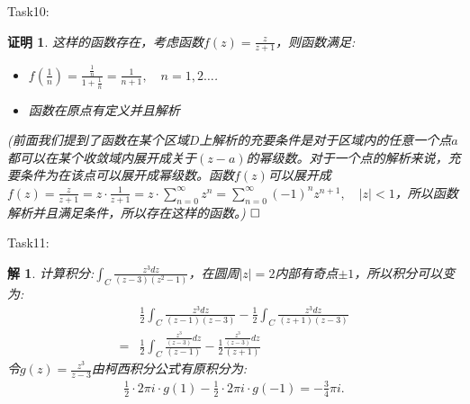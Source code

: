 \documentclass{ctexart}
\newcommand{\。}{．} %
\newenvironment{lanse}{
    \begin{tcolorbox}[breakable,enhanced, colback=qlan, boxrule=0pt, frame hidden,
        borderline west={0.7mm}{0.1mm}{slan}]
    }
    {\end{tcolorbox}}
\theoremstyle{t} %
\newtheorem*{tmhj}{\color{slan} 解}
\newtheorem*{zmhj}{\color{slan} 证明}
\newenvironment{zm}{\begin{lanse}\begin{zmhj}}{$\hfill \square$\end{zmhj}\end{lanse}}
\newenvironment{tm}{\begin{lanse}\begin{tmhj}}{\end{tmhj}\end{lanse}}
\begin{document}
Task10:
\begin{zm}
    这样的函数存在，考虑函数$f(z)=\frac{z}{z+1}$，则函数满足:
    \begin{itemize}
        \item $f(\frac{1}{n})=\frac{\frac{1}{n}}{1+\frac{1}{n}}=\frac{1}{n+1},\quad n=1,2\dots$.
        \item 函数在原点有定义并且解析
    \end{itemize}
    (前面我们提到了函数在某个区域$D$上解析的充要条件是对于区域内的任意一个点$a$都可以在某个收敛域内展开成关于$(z-a)$的幂级数。对于一个点的解析来说，充要条件为在该点可以展开成幂级数。函数$f(z)$可以展开成$f(z)=\frac{z}{z+1}=z\cdot \frac{1}{z+1}=z\cdot\sum_{n=0}^{\infty}z^n=\sum_{n=0}^{\infty}(-1)^nz^{n+1},\quad |z|<1$，所以函数解析并且满足条件，所以存在这样的函数。)
\end{zm}
Task11:
\begin{tm}
    计算积分:$\int_{C}\frac{z^3dz}{(z-3)(z^2-1)}$，在圆周$|z|=2$内部有奇点$\pm 1$，所以积分可以变为:
    \begin{align*}
        &\frac{1}{2}\int_{C}\frac{z^3dz}{(z-1)(z-3)}-\frac{1}{2}\int_{C}\frac{z^3dz}{(z+1)(z-3)}\\
        =&\frac{1}{2}\int_{C}\frac{\frac{z^3}{(z-3)}dz}{(z-1)}-\frac{1}{2}\frac{\frac{z^3}{(z-3)}dz}{(z+1)}
    \end{align*}
    令$g(z)=\frac{z^3}{z-3}$由柯西积分公式有原积分为:
    \begin{align*}
        \frac{1}{2}\cdot 2\pi i\cdot g(1)-\frac{1}{2}\cdot 2\pi i\cdot g(-1)=-\frac{3}{4}\pi i.
    \end{align*}
\end{tm}
\end{document}
